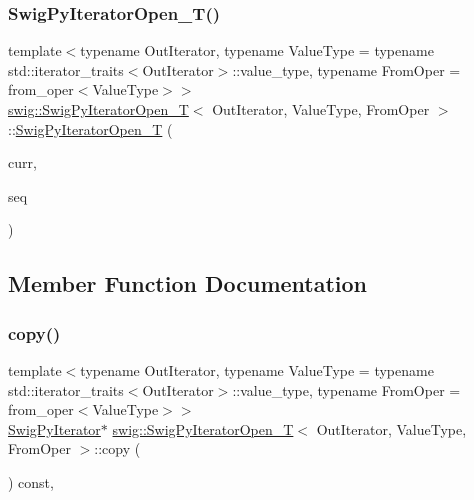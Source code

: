 \subsubsection{\texorpdfstring{Swig\+Py\+Iterator\+Open\+\_\+\+T()}{SwigPyIteratorOpen\_T()}}
{\footnotesize\ttfamily template$<$typename Out\+Iterator, typename Value\+Type = typename std\+::iterator\+\_\+traits$<$\+Out\+Iterator$>$\+::value\+\_\+type, typename From\+Oper = from\+\_\+oper$<$\+Value\+Type$>$$>$ \\
\hyperlink{classswig_1_1_swig_py_iterator_open___t}{swig\+::\+Swig\+Py\+Iterator\+Open\+\_\+T}$<$ Out\+Iterator, Value\+Type, From\+Oper $>$\+::\hyperlink{classswig_1_1_swig_py_iterator_open___t}{Swig\+Py\+Iterator\+Open\+\_\+T} (\begin{DoxyParamCaption}\item[{\hyperlink{classswig_1_1_swig_py_iterator___t_aec35545038c3d804975a147253f061e4}{out\+\_\+iterator}}]{curr,  }\item[{Py\+Object $\ast$}]{seq }\end{DoxyParamCaption})\hspace{0.3cm}{\ttfamily [inline]}}



\subsection{Member Function Documentation}
\mbox{\label{classswig_1_1_swig_py_iterator_open___t_a98aa48ae93af61706ec3b587d2c7dda6}} 
\subsubsection{\texorpdfstring{copy()}{copy()}}
{\footnotesize\ttfamily template$<$typename Out\+Iterator, typename Value\+Type = typename std\+::iterator\+\_\+traits$<$\+Out\+Iterator$>$\+::value\+\_\+type, typename From\+Oper = from\+\_\+oper$<$\+Value\+Type$>$$>$ \\
\hyperlink{structswig_1_1_swig_py_iterator}{Swig\+Py\+Iterator}$\ast$ \hyperlink{classswig_1_1_swig_py_iterator_open___t}{swig\+::\+Swig\+Py\+Iterator\+Open\+\_\+T}$<$ Out\+Iterator, Value\+Type, From\+Oper $>$\+::copy (\begin{DoxyParamCaption}{ }\end{DoxyParamCaption}) const\hspace{0.3cm}{\ttfamily [inline]}, {\ttfamily [virtual]}}



